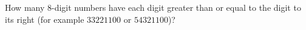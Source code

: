 How many $8$-digit numbers have each digit greater than or equal to the digit to its right (for example $33221100$ or $54321100$)?
